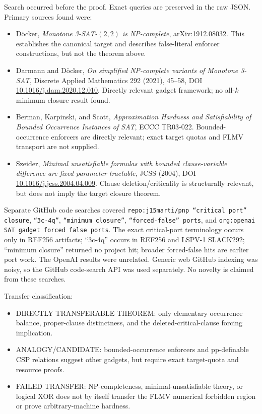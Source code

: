 \documentclass[11pt]{article}
\newcommand{\status}[1]{\textsf{#1}}
\begin{document}
Search occurred before the proof.  Exact queries are preserved in the raw JSON.  Primary sources found were:
\begin{itemize}
\item D\"ocker, \emph{Monotone 3-SAT-$(2,2)$ is NP-complete}, arXiv:1912.08032.  This establishes the canonical target and describes false-literal enforcer constructions, but not the theorem above.
\item Darmann and D\"ocker, \emph{On simplified NP-complete variants of Monotone 3-SAT}, Discrete Applied Mathematics 292 (2021), 45--58, DOI \href{https://doi.org/10.1016/j.dam.2020.12.010}{10.1016/j.dam.2020.12.010}.  Directly relevant gadget framework; no all-$k$ minimum closure result found.
\item Berman, Karpinski, and Scott, \emph{Approximation Hardness and Satisfiability of Bounded Occurrence Instances of SAT}, ECCC TR03-022.  Bounded-occurrence enforcers are directly relevant; exact target quotas and FLMV transport are not supplied.
\item Szeider, \emph{Minimal unsatisfiable formulas with bounded clause-variable difference are fixed-parameter tractable}, JCSS (2004), DOI \href{https://doi.org/10.1016/j.jcss.2004.04.009}{10.1016/j.jcss.2004.04.009}.  Clause deletion/criticality is structurally relevant, but does not imply the target closure theorem.
\end{itemize}

Separate GitHub code searches covered
\texttt{repo:j15marti/pnp ``critical port'' closure},
\texttt{``3c-4q''},
\texttt{``minimum closure''},
\texttt{``forced-false'' ports}, and
\texttt{org:openai SAT gadget forced false ports}.
The exact critical-port terminology occurs only in REF256 artifacts; ``3c-4q'' occurs in REF256 and LSPV-1 SLACK292; ``minimum closure'' returned no project hit; broader forced-false hits are earlier port work.  The OpenAI results were unrelated.  Generic web GitHub indexing was noisy, so the GitHub code-search API was used separately.  No novelty is claimed from these searches.

Transfer classification:
\begin{itemize}
\item \status{DIRECTLY TRANSFERABLE THEOREM}: only elementary occurrence balance, proper-clause distinctness, and the deleted-critical-clause forcing implication.
\item \status{ANALOGY/CANDIDATE}: bounded-occurrence enforcers and pp-definable CSP relations suggest other gadgets, but require exact target-quota and resource proofs.
\item \status{FAILED TRANSFER}: NP-completeness, minimal-unsatisfiable theory, or logical XOR does not by itself transfer the FLMV numerical forbidden region or prove arbitrary-machine hardness.
\end{itemize}
\end{document}
